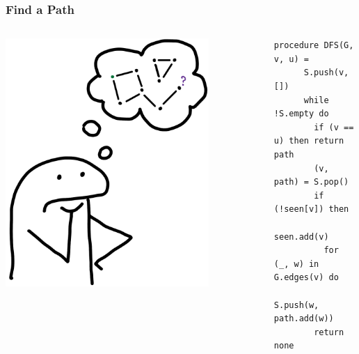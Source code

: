 \documentclass[xcolor={dvipsnames}, aspectratio=169]{beamer}
\begin{document}
\begin{frame}[fragile]
  \frametitle{Find a Path}
  \begin{columns}    
    \begin{column}{0.35\textwidth}
      \centering
      \includegraphics[width=0.8\textwidth]{pic/path.jpg}
    \end{column} \pause
    \begin{column}{0.75\textwidth} 
      \begin{lstlisting}[language=imperative]
    procedure DFS(G, v, u) = 
      S.push(v, [])
      while !S.empty do
        if (v == u) then return path
        (v, path) = S.pop()
        if (!seen[v]) then
          seen.add(v)
          for (_, w) in G.edges(v) do 
            S.push(w, path.add(w))
        return none
      \end{lstlisting}
    \end{column}
    \end{columns}
\end{frame}
\end{document}
